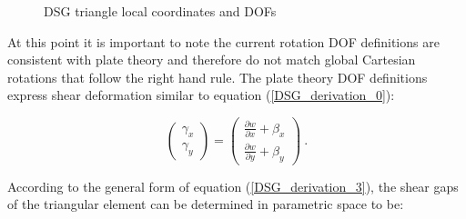 \begin{figure}[H]
	\centering
	\caption{\label{DSG_derivation_pic2}DSG triangle local coordinates and DOFs \cite{Ngu13}}
\end{figure}

At this point it is important to note the current rotation DOF definitions are consistent with plate theory and therefore do not match global Cartesian rotations that follow the right hand rule. The plate theory DOF definitions express shear deformation similar to equation (\ref{DSG_derivation_0}):

\begin{equation} 
\begin{pmatrix}
\gamma_x \\
\gamma_y
\end{pmatrix}
=
\begin{pmatrix}
\frac{\partial w}{\partial x} +  \beta_x \\
\frac{\partial w}{\partial y} +  \beta_y
\end{pmatrix}
\label{DSG_derivation_5}\ .
\end{equation}

According to the general form of equation (\ref{DSG_derivation_3}), the shear gaps of the triangular element can be determined in parametric space to be:

